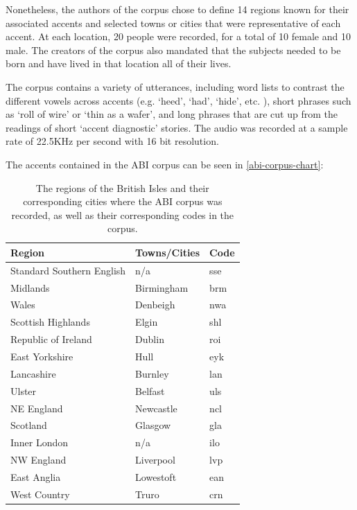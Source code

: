 \documentclass
[
    a4paper,
    twoside,
    12pt,
]
{report}
\begin{document}
Nonetheless, the authors of the corpus chose to define 14 regions known
for their associated accents and selected towns or cities that were
representative of each accent. At each location, 20 people were
recorded, for a total of 10 female and 10 male. The creators of the
corpus also mandated that the subjects needed to be born and have lived
in that location all of their lives.

The corpus contains a variety of utterances, including word lists to
contrast the different vowels across accents (e.g. `heed', `had',
`hide', etc. ), short phrases such as `roll of wire' or `thin as a
wafer', and long phrases that are cut up from the readings of short
`accent diagnostic' stories. The audio was recorded at a sample rate of
22.5KHz per second with 16 bit resolution.

The accents contained in the ABI corpus can be seen in
\autoref{abi-corpus-chart}:

\begin{table}[]
\centering
\begin{tabular}{|l|l|l|}
\hline
\textbf{Region} & \textbf{Towns/Cities} & \textbf{Code} \\ \hline
Standard Southern English & n/a & sse \\ \hline
Midlands & Birmingham & brm \\ \hline
Wales & Denbeigh & nwa \\ \hline
Scottish Highlands & Elgin & shl \\ \hline
Republic of Ireland & Dublin & roi \\ \hline
East Yorkshire & Hull & eyk \\ \hline
Lancashire & Burnley & lan \\ \hline
Ulster & Belfast & uls \\ \hline
NE England & Newcastle & ncl \\ \hline
Scotland & Glasgow & gla \\ \hline
Inner London & n/a & ilo \\ \hline
NW England & Liverpool & lvp \\ \hline
East Anglia & Lowestoft & ean \\ \hline
West Country & Truro & crn \\ \hline
\end{tabular}
\caption{The regions of the British Isles and their corresponding cities where the ABI corpus was recorded, as well as their corresponding codes in the corpus.}
\label{abi-corpus-chart}
\end{table}
\end{document}
